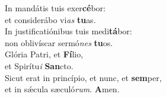 \oddverse In mandátis tuis exer\textbf{cé}bor:~\*\\
\oddverse et considerábo vi\textit{as} \textbf{tu}as.\\
\evenverse In justificatiónibus tuis medi\textbf{tá}bor:~\*\\
\evenverse non oblivíscar sermó\textit{nes} \textbf{tu}os.\\
\oddverse Glória Patri, et \textbf{Fí}lio,~\*\\
\oddverse et Spirítu\textit{i} \textbf{San}cto.\\
\evenverse Sicut erat in princípio, et nunc, et \textbf{sem}per,~\*\\
\evenverse et in sǽcula sæculó\textit{rum}. \textbf{A}men.\\

